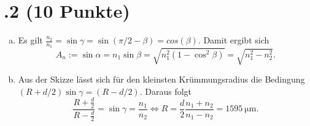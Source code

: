 \section*{\nr.2 \tittwo (10 Punkte)}
\begin{enumerate}[(a)]
\item Es gilt $\frac{n_2}{n_1} = \sin \gamma = \sin(\pi/2 - \beta) = cos(\beta)$. Damit ergibt sich
\begin{equation}
	A_n := \sin \alpha = n_1 \sin \beta = \sqrt{n_1^2(1 - \cos^2 \beta)} = \sqrt{n_1^2 - n_2^2}.
\end{equation}
\item Aus der Skizze lässt sich für den kleinsten Krümmungsradius die Bedingung $\left(R + d/2\right)\sin\gamma = \left(R - d/2\right)$. Daraus folgt
\begin{equation}
	\frac{R+\frac{d}{2}}{R-\frac{d}{2}} = \sin\gamma = \frac{n_1}{n_2} \Leftrightarrow R = \frac{d}{2}\frac{n_1 + n_2}{n_1 - n_2} = \SI{1595}{\micro\metre}.
\end{equation}
\end{enumerate}
